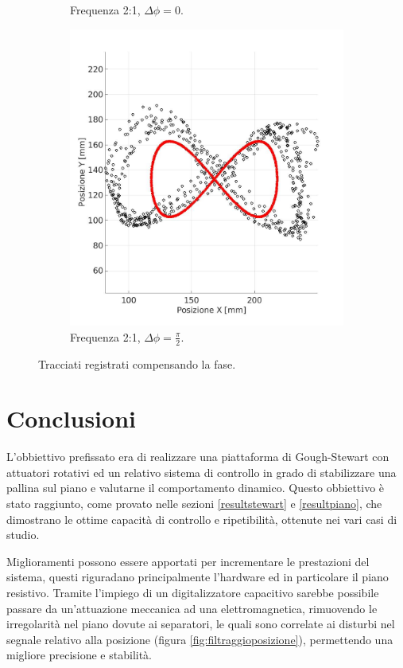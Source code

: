 \documentclass[12pt,twoside,openright]{report}
\begin{document}
\begin{figure}[h!]
\begin{subfigure}{0.49\textwidth}
    \caption{Frequenza 2:1, $\Delta \phi= 0$.}
    \label{fig:uc1}
\end{subfigure}
\hfill
\begin{subfigure}{0.49\textwidth}
    \includegraphics[width=\textwidth]{ic.jpg}
    \caption{Frequenza 2:1, $\Delta \phi= \frac{\pi}{2}$.}
    \label{fig:ic1}
\end{subfigure}     
\vspace*{10mm}
\caption{Tracciati registrati compensando la fase.}
\end{figure}
\label{fig:phasecorr}


\chapter{Conclusioni}
L'obbiettivo prefissato era di realizzare una piattaforma di Gough-Stewart con attuatori rotativi ed un relativo sistema di controllo in grado di stabilizzare una pallina sul piano e valutarne il comportamento dinamico. Questo obbiettivo è stato raggiunto, come provato nelle sezioni \ref{resultstewart} e \ref{resultpiano}, che dimostrano le ottime capacità di controllo e ripetibilità, ottenute nei vari casi di studio. 

Miglioramenti possono essere apportati per incrementare le prestazioni del sistema, questi riguradano principalmente l'hardware ed in particolare il piano resistivo. Tramite l'impiego di un digitalizzatore capacitivo sarebbe possibile passare da un'attuazione meccanica ad una elettromagnetica, rimuovendo le irregolarità nel piano dovute ai separatori, le quali sono correlate ai disturbi nel segnale relativo alla posizione (figura \ref{fig:filtraggioposizione}), permettendo una migliore precisione e stabilità. 



%
\newpage
{}
\printbibliography
\end{document}
